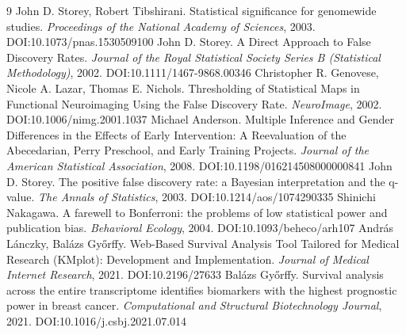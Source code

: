 \documentclass[11pt]{article}
\begin{document}
\begin{thebibliography}{9}
 John D. Storey, Robert Tibshirani. Statistical significance for genomewide studies. \emph{Proceedings of the National Academy of Sciences}, 2003. DOI:10.1073/pnas.1530509100
 John D. Storey. A Direct Approach to False Discovery Rates. \emph{Journal of the Royal Statistical Society Series B (Statistical Methodology)}, 2002. DOI:10.1111/1467-9868.00346
 Christopher R. Genovese, Nicole A. Lazar, Thomas E. Nichols. Thresholding of Statistical Maps in Functional Neuroimaging Using the False Discovery Rate. \emph{NeuroImage}, 2002. DOI:10.1006/nimg.2001.1037
 Michael Anderson. Multiple Inference and Gender Differences in the Effects of Early Intervention: A Reevaluation of the Abecedarian, Perry Preschool, and Early Training Projects. \emph{Journal of the American Statistical Association}, 2008. DOI:10.1198/016214508000000841
 John D. Storey. The positive false discovery rate: a Bayesian interpretation and the q-value. \emph{The Annals of Statistics}, 2003. DOI:10.1214/aos/1074290335
 Shinichi Nakagawa. A farewell to Bonferroni: the problems of low statistical power and publication bias. \emph{Behavioral Ecology}, 2004. DOI:10.1093/beheco/arh107
 András Lánczky, Balázs Győrffy. Web-Based Survival Analysis Tool Tailored for Medical Research (KMplot): Development and Implementation. \emph{Journal of Medical Internet Research}, 2021. DOI:10.2196/27633
 Balázs Győrffy. Survival analysis across the entire transcriptome identifies biomarkers with the highest prognostic power in breast cancer. \emph{Computational and Structural Biotechnology Journal}, 2021. DOI:10.1016/j.csbj.2021.07.014
\end{thebibliography}
\end{document}

